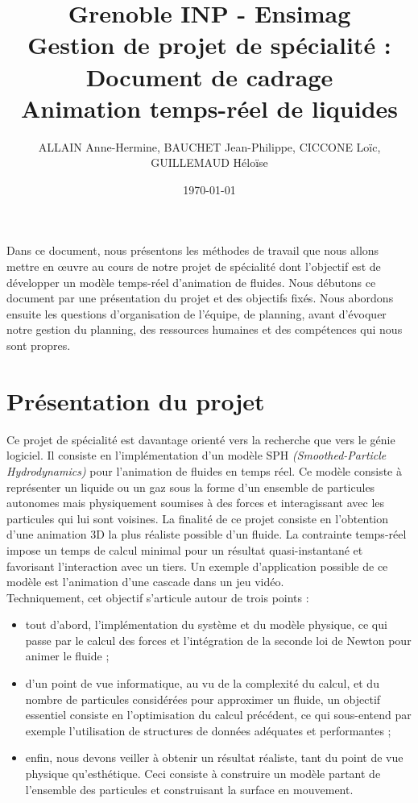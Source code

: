 \documentclass[a4paper,11pt]{article}
\title{\normalsize Grenoble INP - Ensimag \\ Gestion de projet de spécialité : Document de cadrage \\ Animation temps-réel de liquides}
\author{\small ALLAIN Anne-Hermine, BAUCHET Jean-Philippe, CICCONE Loïc, GUILLEMAUD Héloïse}
\date{\small \today}
\begin{document}
\maketitle

Dans ce document, nous présentons les méthodes de travail que nous allons mettre en \oe{}uvre au cours de notre projet de spécialité dont l'objectif est de développer un modèle temps-réel d'animation de fluides. Nous débutons ce document par une présentation du projet et des objectifs fixés. Nous abordons ensuite les questions d'organisation de l'équipe, de planning, avant d'évoquer notre gestion du planning, des ressources humaines et des compétences qui nous sont propres.

\section{Présentation du projet}

Ce projet de spécialité est davantage orienté vers la recherche que vers le génie logiciel. Il consiste en l'implémentation d'un modèle SPH {\em (Smoothed-Particle Hydrodynamics)} pour l'animation de fluides en temps réel. Ce modèle consiste à représenter un liquide ou un gaz sous la forme d'un ensemble de particules autonomes mais physiquement soumises à des forces et interagissant avec les particules qui lui sont voisines. La finalité de ce projet consiste en l'obtention d'une animation 3D la plus réaliste possible d'un fluide. La contrainte temps-réel impose un temps de calcul minimal pour un résultat quasi-instantané et favorisant l'interaction avec un tiers. Un exemple d'application possible de ce modèle est l'animation d'une cascade dans un jeu vidéo. \\

Techniquement, cet objectif s'articule autour de trois points : \\

\begin{itemize}
\item tout d'abord, l'implémentation du système et du modèle physique, ce qui passe par le calcul des forces et l'intégration de la seconde loi de Newton pour animer le fluide ;
\item d'un point de vue informatique, au vu de la complexité du calcul, et du nombre de particules considérées pour approximer un fluide, un objectif essentiel consiste en l'optimisation du calcul précédent, ce qui sous-entend par exemple l'utilisation de structures de données adéquates et performantes ;
\item enfin, nous devons veiller à obtenir un résultat réaliste, tant du point de vue physique qu'esthétique. Ceci consiste à construire un modèle partant de l'ensemble des particules et construisant la surface en mouvement. \\
\end{itemize}
\end{document}
